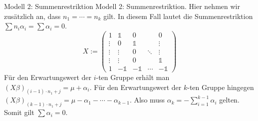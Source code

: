 \begin{karte}{Modell 2: Summenrestriktion}
Modell 2: Summenrestriktion. 
Hier nehmen wir zusätzlich an, dass \(n_1 = \cdots = n_k\) gilt. 
In diesem Fall lautet die Summenrestriktion \(\sum n_i \alpha_i = \sum \alpha_i = 0\).
\[ X := \begin{pmatrix}
    1 & \mathds{1} & 0 & & 0\\
    \vdots & 0 & \mathds{1} & & \vdots \\
    \vdots & \vdots & 0 & \ddots & \vdots \\
    \vdots & \vdots & 0 & & \mathds{1} \\
    1 & -\mathds{1} & -\mathds{1} & \cdots & -\mathds{1}
\end{pmatrix} \]
Für den Erwartungswert der \(i\)-ten Gruppe erhält man 
\((X \beta)_{(i-1)\cdot n_1 + j} = \mu + \alpha_i\). Für den Erwartungswert der \(k\)-ten Gruppe hingegen 
\((X \beta)_{(k-1)\cdot n_1 + j} = \mu - \alpha_1 - \cdots - \alpha_{k-1}\).
Also muss \(\alpha_k = -\sum_{i=1}^{k-1} \alpha_i\) gelten. Somit gilt \(\sum \alpha_i = 0\).
\end{karte}

